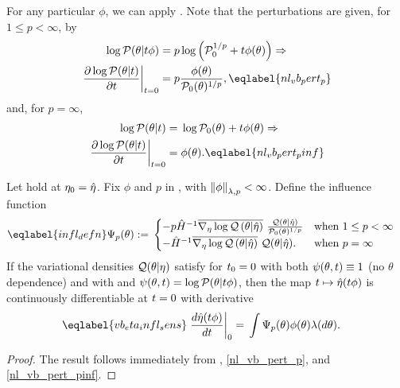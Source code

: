 For any particular $\phi$, we can apply .  Note that the
perturbations are given, for $1 \le p < \infty$, by
%
\begin{align}
%
\logp(\theta \vert \t \phi) ={}&
   p \log\left(\pbase^{1/p} + \t \phi(\theta) \right) \Rightarrow \nonumber\\
\fracat{\partial \log \p(\theta \vert \t)}{\partial \t}{\t=0} ={}&
   p \frac{\phi(\theta)}{\pbase(\theta)^{1/p}},
   \eqlabel{nl_vb_pert_p}
%
\end{align}
%
and, for $p = \infty$,
%
\begin{align}
%
\logp(\theta \vert \t) ={}&
   \log \pbase(\theta) + \t \phi(\theta)
\Rightarrow \nonumber\\
\fracat{\partial \log \p(\theta \vert \t)}{\partial \t}{\t=0} ={}&
   \phi(\theta).
\eqlabel{nl_vb_pert_pinf}
%
\end{align}



\begin{cor}
%
Let  hold at $\eta_0 = \hat\eta$.
%
Fix $\phi$ and $p$ in , with $\left\Vert\phi\right\Vert_{\lambda,p} <
\infty$.  Define the influence function
%
\begin{align}\eqlabel{infl_defn}
%
\infl_p(\theta) :={}&
\begin{cases}
    - p \hessopt^{-1}
        \lqgradbar{\theta \vert \etaopt}
        \frac{\q(\theta \vert \etaopt)}{\pbase(\theta)^{1/p}}
& \textrm{when }1 \le p < \infty \\
%
    - \hessopt^{-1}
        \lqgradbar{\theta \vert \etaopt}
        \q(\theta \vert \etaopt).
& \textrm{when }p = \infty
%
\end{cases}
%
\end{align}
%
If the variational densities $\mathcal{Q}(\theta \vert \eta)$ satisfy
 for $t_0 = 0$ with both $\psi(\theta, t) \equiv 1$ (no
$\theta$ dependence) and with and $\psi(\theta, t) = \log \mathcal{P}(\theta \vert t
\phi)$, then the map $t \mapsto \hat\eta(t \phi)$ is continuously
differentiable at $t=0$ with derivative
%
\begin{align}\eqlabel{vb_eta_infl_sens}
%
\fracat{d \etaopt(\t \phi)}{d \t}{0} ={}&
    \int \infl_p(\theta) \phi(\theta) \lambda(d\theta).
%
\end{align}
%
\begin{proof}
%
The result follows immediately from , \eqref{nl_vb_pert_p},
and \eqref{nl_vb_pert_pinf}.
%
\end{proof}
%
\end{cor}

